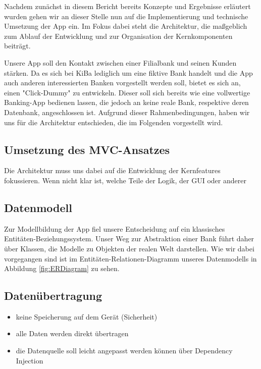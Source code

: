	Nachdem zunächst in diesem Bericht bereits Konzepte und Ergebnisse erläutert wurden gehen wir an dieser Stelle nun auf die Implementierung und technische Umsetzung der App ein. Im Fokus dabei steht die Architektur, die maßgeblich zum Ablauf der Entwicklung und zur Organisation der Kernkomponenten beiträgt.
	
	Unsere App soll den Kontakt zwischen einer Filialbank und seinen Kunden stärken. Da es sich bei KiBa lediglich um eine fiktive Bank handelt und die App auch anderen interessierten Banken vorgestellt werden soll, bietet es sich an, einen "Click-Dummy" zu entwickeln. Dieser soll sich bereits wie eine vollwertige Banking-App bedienen lassen, die jedoch an keine reale Bank, respektive deren Datenbank, angeschlossen ist. Aufgrund dieser Rahmenbedingungen, haben wir uns für die Architektur entschieden, die im Folgenden vorgestellt wird.

\subsection{Umsetzung des MVC-Ansatzes}
	Die Architektur muss uns dabei auf die Entwicklung der Kernfeatures fokussieren. Wenn nicht klar ist, welche Teile der Logik, der GUI oder anderer 

\subsection{Datenmodell}	
	Zur Modellbildung der App fiel unsere Entscheidung auf ein klassisches Entitäten-Be\-zieh\-ungs\-sys\-tem. Unser Weg zur Abstraktion einer Bank führt daher 
	über Klassen, die Modelle zu Objekten der realen Welt darstellen. Wie wir dabei vorgegangen sind ist im Entitäten-Relationen-Diagramm unseres Datenmodells in Abbildung \ref{fig:ERDiagram} zu sehen.
	
	

\subsection{Datenübertragung}
\begin{itemize}
	\item keine Speicherung auf dem Gerät (Sicherheit)
	\item alle Daten werden direkt übertragen
	\item die Datenquelle soll leicht angepasst werden können über Dependency Injection
\end{itemize}

